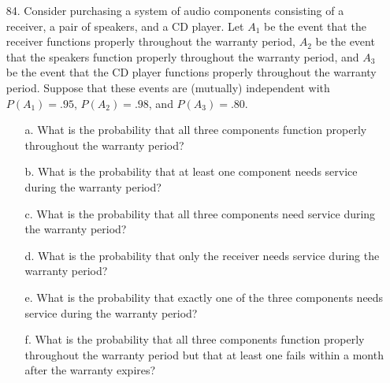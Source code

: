 \documentclass[letterpaper,12pt]{article}
\begin{document}
\begin{enumerate}
  \item[84.]
    Consider purchasing a system of audio components consisting of a receiver, a pair of speakers, and a CD player. Let $A_1$ be the event that the receiver functions properly throughout the warranty period, $A_2$ be the event that the speakers function properly throughout the warranty period, and $A_3$ be the event that the CD player functions properly throughout the warranty period. Suppose that these events are (mutually) independent with $P(A_1) = .95$, $P(A_2) = .98$, and $P(A_3) = .80$.
    \begin{enumerate}
      \item[a.]
        What is the probability that all three components function properly throughout the warranty period?
      \item[b.]
        What is the probability that at least one component needs service during the warranty period?
      \item[c.]
        What is the probability that all three components need service during the warranty period?
      \item[d.]
        What is the probability that only the receiver needs service during the warranty period?
      \item[e.]
        What is the probability that exactly one of the three components needs service during the warranty period?
      \item[f.]
        What is the probability that all three components function properly throughout the warranty period but that at least one fails within a month after the warranty expires?
    \end{enumerate}
\end{enumerate}
\end{document}
